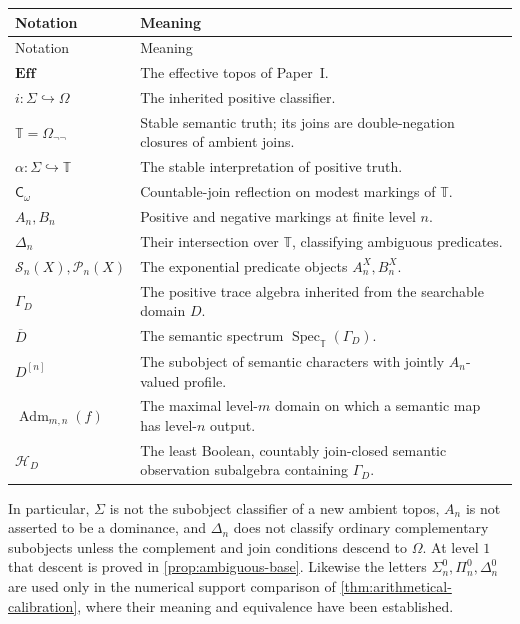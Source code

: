 \documentclass[11pt,a4paper]{article}
\numberwithin{equation}{section}
\theoremstyle{definition}
\theoremstyle{remark}
\theoremstyle{plain}
\newcommand{\E}{\mathbf{Eff}}
\newcommand{\TV}{\mathbb T}
\newcommand{\Spec}{\operatorname{Spec}}
\newcommand{\Adm}{\operatorname{Adm}}
\newcommand{\incl}{\hookrightarrow}
\newcommand{\Cw}{\mathsf C_{\omega}}
\newcommand{\SSn}{\mathcal S}
\newcommand{\PPn}{\mathcal P}
\begin{document}
\begin{longtable}{L{.26\linewidth}L{.66\linewidth}}
\toprule
Notation & Meaning\\
\midrule
\endfirsthead
\toprule
Notation & Meaning\\
\midrule
\endhead
\bottomrule
\endfoot
$\E$ & The effective topos of Paper~I.\\
$i:\Sigma\incl\Omega$ & The inherited positive classifier.\\
$\TV=\Omega_{\neg\neg}$ & Stable semantic truth; its joins are
double-negation closures of ambient joins.\\
$\alpha:\Sigma\incl\TV$ & The stable interpretation of positive truth.\\
$\Cw$ & Countable-join reflection on modest markings of $\TV$.\\
$A_n,B_n$ & Positive and negative markings at finite level $n$.\\
$\Delta_n$ & Their intersection over $\TV$, classifying ambiguous predicates.\\
$\SSn_n(X),\PPn_n(X)$ & The exponential predicate objects $A_n^X,B_n^X$.\\
$\Gamma_D$ & The positive trace algebra inherited from the searchable domain $D$.\\
$\overline D$ & The semantic spectrum $\Spec_{\TV}(\Gamma_D)$.\\
$D^{[n]}$ & The subobject of semantic characters with jointly $A_n$-valued profile.\\
$\Adm_{m,n}(f)$ & The maximal level-$m$ domain on which a semantic map
has level-$n$ output.\\
$\mathcal H_D$ & The least Boolean, countably join-closed semantic
observation subalgebra containing $\Gamma_D$.\\
\end{longtable}

In particular, $\Sigma$ is not the subobject classifier of a new ambient
topos, $A_n$ is not asserted to be a dominance, and $\Delta_n$ does not
classify ordinary complementary subobjects unless the complement and
join conditions descend to $\Omega$. At level $1$ that descent is
proved in \cref{prop:ambiguous-base}. Likewise the letters
$\Sigma^0_n,\Pi^0_n,\Delta^0_n$ are used only in the numerical support
comparison of \cref{thm:arithmetical-calibration}, where their meaning
and equivalence have been established.
\end{document}
